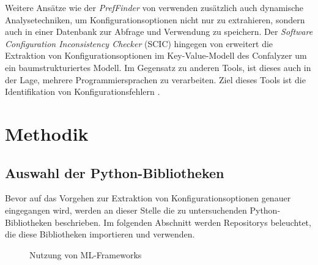 \documentclass[german,bachelor]{swsLeipzig}
\begin{document}
Weitere Ansätze wie der \textit{PrefFinder} von \citeauthor{10.1145/2642937.2643009} verwenden zusätzlich auch dynamische
Analysetechniken, um Konfigurationsoptionen nicht nur zu extrahieren, sondern auch in einer Datenbank zur Abfrage und
Verwendung zu speichern.
Der \textit{Software Configuration Inconsistency Checker} (SCIC) hingegen von \citeauthor{10.1145/2786805.2786869}
erweitert die Extraktion von Konfigurationsoptionen im Key-Value-Modell des Confalyzer um ein baumstrukturiertes Modell.
Im Gegensatz zu anderen Tools, ist dieses auch in der Lage, mehrere Programmiersprachen zu verarbeiten.
Ziel dieses Tools ist die Identifikation von Konfigurationsfehlern \cite[]{10.1145/2786805.2786869}.\\


\chapter{Methodik}\label{Methodik}


\section{Auswahl der Python-Bibliotheken}
Bevor auf das Vorgehen zur Extraktion von Konfigurationsoptionen genauer eingegangen wird, werden an dieser Stelle die
zu untersuchenden Python-Bibliotheken beschrieben.
Im folgenden Abschnitt werden Repositorys beleuchtet, die diese Bibliotheken importieren und verwenden.\\

\begin{figure}[H]
\begin{center}
\caption{Nutzung von ML-Frameworks \cite[]{kaggle}} \label{fig:kaggle}
\end{center}
\end{figure}
\end{document}
